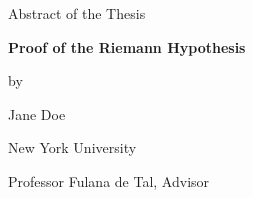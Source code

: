 \documentclass[12pt,letterpaper]{article}
\newcommand{\thesistitle}{Proof of the Riemann Hypothesis}
\newcommand{\thesisauthor}{Jane Doe}
\newcommand{\thesisadvisor}{Professor Fulana de Tal}
\begin{document}
  \begin{center}
    Abstract of the Thesis\bigskip

    \textbf{\thesistitle}\bigskip

    by\bigskip

    \thesisauthor\bigskip

    New York University\bigskip

    \thesisadvisor, Advisor
  \end{center}
\bigskip


\end{document}
